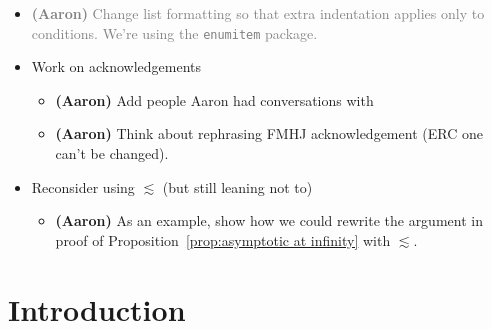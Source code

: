 \documentclass{article}
\theoremstyle{plain}
\newenvironment{brainstorm}{\color{violet}\begin{itemize}}{\end{itemize}\color{black}}
\begin{document}
\begin{brainstorm}
\begin{itemize}
\end{itemize}
\color{violet}
\item \textcolor{gray}{\textbf{(Aaron)} Change list formatting so that extra indentation applies only to conditions. We're using the \texttt{enumitem} package.}
\item Work on acknowledgements
\begin{itemize}
\item \textbf{(Aaron)} Add people Aaron had conversations with
\item \textbf{(Aaron)} Think about rephrasing FMHJ acknowledgement (ERC one can't be changed).
\end{itemize}
\item Reconsider using $\lesssim$ (but still leaning not to)
\begin{itemize}
    \item \textbf{(Aaron)} As an example, show how we could rewrite the argument in proof of Proposition~\ref{prop:asymptotic at infinity} with $\lesssim$.
\end{itemize}
\end{brainstorm}
\section{Introduction}
\end{document}
